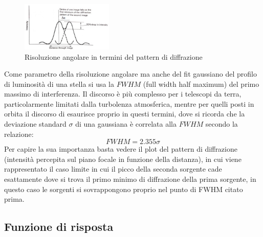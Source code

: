 \begin{figure}
	\vspace{-10pt}
	\centering
	\includegraphics[width=0.39\textwidth]{Immagini/Capitolo2/Risoluzione_angolare.PNG}
	\caption{Risoluzione angolare in termini del pattern di diffrazione}
	\vspace{-5pt}
\end{figure}

Come parametro della risoluzione angolare ma anche del fit gaussiano del profilo di luminosità di una stella si usa la $FWHM$ (full width half maximum) del primo massimo di interferenza. Il discorso è più complesso per i telescopi da terra, particolarmente limitati dalla turbolenza atmosferica, mentre per quelli posti in orbita il discorso di esaurisce proprio in questi termini, dove si ricorda che la deviazione standard $\sigma$ di una gaussiana è correlata alla $FWHM$ secondo la relazione:
\begin{equation}
	\label{eq:FWHM}
	FWHM=2.355\sigma
\end{equation}
Per capire la sua importanza basta vedere il plot del pattern di diffrazione (intensità percepita sul piano focale in funzione della distanza), in cui viene rappresentato il caso limite in cui il picco della seconda sorgente cade esattamente dove si trova il primo minimo di diffrazione della prima sorgente, in questo caso le sorgenti si sovrappongono proprio nel punto di FWHM citato prima.

\subsection*{Funzione di risposta}


